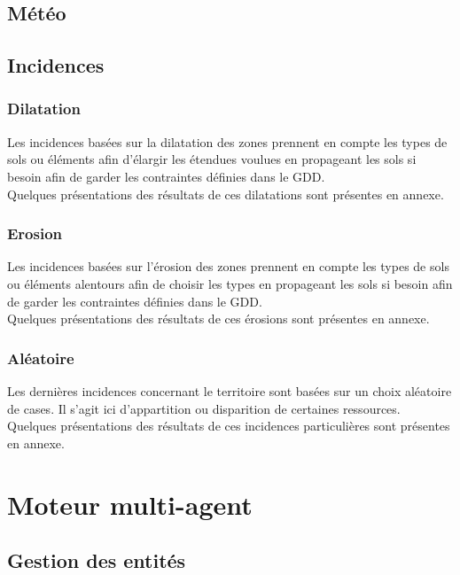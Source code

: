 \documentclass[a4paper]{article}
\newcommand{\alinea}{\hspace*{0.5cm}}
\begin{document}
      \subsection{Météo}
      
      \subsection{Incidences}
        \subsubsection{Dilatation}
          \alinea Les incidences basées sur la dilatation des zones prennent en compte les types de sols ou éléments afin d'élargir les étendues voulues en propageant les sols si besoin afin de garder les contraintes définies dans le GDD.\\
          \alinea Quelques présentations des résultats de ces dilatations sont présentes en annexe.\\
        
        \subsubsection{Erosion}
          \alinea Les incidences basées sur l'érosion des zones prennent en compte les types de sols ou éléments alentours afin de choisir les types en propageant les sols si besoin afin de garder les contraintes définies dans le GDD.\\
          \alinea Quelques présentations des résultats de ces érosions sont présentes en annexe.\\
        
        \subsubsection{Aléatoire}
          \alinea Les dernières incidences concernant le territoire sont basées sur un choix aléatoire de cases. Il s'agit ici d'appartition ou disparition de certaines ressources.\\
          \alinea Quelques présentations des résultats de ces incidences particulières sont présentes en annexe.\\

	\section{Moteur multi-agent}
	
		\subsection{Gestion des entités}
		
\end{document}
